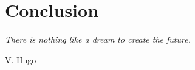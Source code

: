 
\chapter[Conclusion]{Conclusion} %
\label{chap:conclusion}


\epigraph{\small\itshape There is nothing like a dream to create the future.}{V. Hugo}


